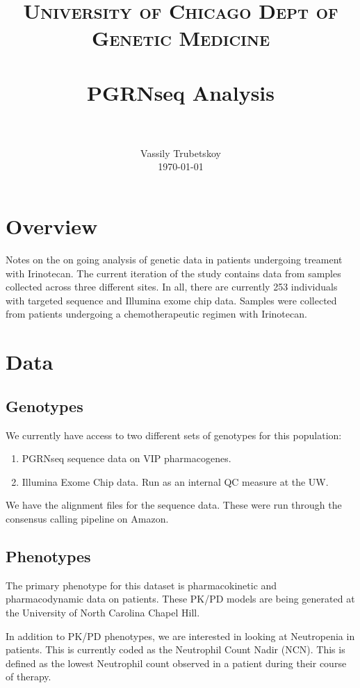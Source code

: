 \documentclass[paper=a4, fontsize=11pt]{scrartcl}	%
\title{
		\usefont{OT1}{bch}{b}{n}
		\normalfont \normalsize \textsc{University of Chicago Dept of Genetic Medicine} \\ [25pt]
		\horrule{0.5pt} \\[0.4cm]
		\huge PGRNseq Analysis \\
		\horrule{2pt} \\[0.5cm]
}
\author{
		\normalfont 								\normalsize
        Vassily Trubetskoy \\[-3pt]		\normalsize
        \today
}
\date{}
\numberwithin{equation}{section}		%
\numberwithin{figure}{section}			%
\numberwithin{table}{section}				%
\begin{document}
\maketitle

\section{Overview}

Notes on the on going analysis of genetic data in patients undergoing treament with Irinotecan. The current iteration of the study contains data from samples collected across three different sites. In all, there are currently 253 individuals with targeted sequence and Illumina exome chip data. Samples were collected from patients undergoing a chemotherapeutic regimen with Irinotecan.

\newpage

\section{Data}

	\subsection{Genotypes}

We currently have access to two different sets of genotypes for this population:
	
	\begin{enumerate}
		\item PGRNseq sequence data on VIP pharmacogenes.
		\item Illumina Exome Chip data. Run as an internal QC measure at the UW.
	\end{enumerate}
	
We have the alignment files for the sequence data. These were run through the consensus calling pipeline on Amazon.

	\subsection{Phenotypes}
	
The primary phenotype for this dataset is pharmacokinetic and pharmacodynamic data on patients. These PK/PD models are being generated at the University of North Carolina Chapel Hill.

In addition to PK/PD phenotypes, we are interested in looking at Neutropenia in patients. This is currently coded as the Neutrophil Count Nadir (NCN). This is defined as the lowest Neutrophil count observed in a patient during their course of therapy.
\end{document}
